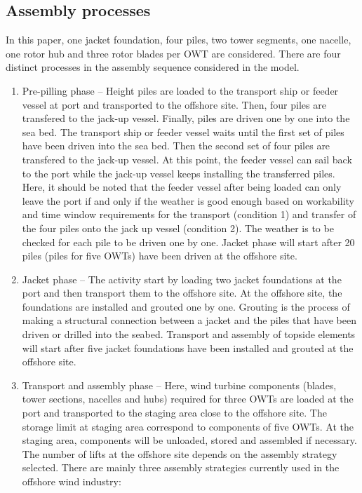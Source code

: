 \subsection{Assembly processes}
In this paper, one jacket foundation, four piles, two tower segments, one nacelle, one rotor hub and three rotor blades per OWT are considered. There are four distinct processes in the assembly sequence considered in the model.
\begin{enumerate}
\item Pre-pilling phase -- Height piles are loaded to the transport ship or feeder vessel at port and transported to the offshore site. Then, four piles are transfered to the jack-up vessel. Finally, piles are driven one by one into the sea bed. The transport ship or feeder vessel waits until the first set of piles have been driven into the sea bed. Then the second set of four piles are transfered to the jack-up vessel. At this point, the feeder vessel can sail back to the port while the jack-up vessel keeps installing the transferred piles. Here, it should be noted that the feeder vessel after being loaded can only leave the port if and only if the weather is good enough based on workability and time window requirements for the transport (condition 1) and transfer of the four piles onto the jack up vessel (condition 2). The weather is to be checked for each pile to be driven one by one. Jacket phase will start after 20 piles (piles for five OWTs) have been driven at the offshore site. 

\item Jacket phase -- The activity start by loading two jacket foundations at the port and then transport them to the offshore site. At the offshore site, the foundations are installed and grouted one by one. Grouting is the process of making a structural connection between a jacket and the piles that have been driven or drilled into the seabed. Transport and assembly of topside elements will start after five jacket foundations have been installed and grouted at the offshore site.  

\item Transport and assembly phase -- Here, wind turbine components (blades, tower sections, nacelles and hubs) required for three OWTs are loaded at the port and transported to the staging area close to the offshore site. The storage limit at staging area correspond to components of five OWTs. At the staging area, components will be unloaded, stored and assembled if necessary. The number of lifts at the offshore site depends on the assembly strategy selected. There are mainly three assembly strategies currently used in the offshore wind industry:


\end{enumerate}
